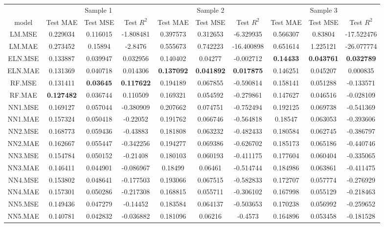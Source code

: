\begin{table}[H]
\centering\begingroup\fontsize{6}{8}\selectfont

\begin{tabular}{cccccccccc}
\toprule
\multicolumn{1}{c}{ } & \multicolumn{3}{c}{Sample 1} & \multicolumn{3}{c}{Sample 2} & \multicolumn{3}{c}{Sample 3} \\
\cmidrule(l{3pt}r{3pt}){2-4} \cmidrule(l{3pt}r{3pt}){5-7} \cmidrule(l{3pt}r{3pt}){8-10}
model & Test MAE & Test MSE & Test $R^2$ & Test MAE & Test MSE & Test $R^2$ & Test MAE & Test MSE & Test $R^2$\\
\midrule
LM.MSE & 0.229034 & 0.116015 & -1.808481 & 0.397573 & 0.312653 & -6.329935 & 0.566307 & 0.83804 & -17.522476\\
LM.MAE & 0.273452 & 0.15894 & -2.8476 & 0.555673 & 0.742223 & -16.400898 & 0.651614 & 1.225121 & -26.077774\\
ELN.MSE & 0.133887 & 0.039947 & 0.032956 & 0.140402 & 0.04277 & -0.002712 & \textbf{0.14433} & \textbf{0.043761} & \textbf{0.032789}\\
ELN.MAE & 0.131369 & 0.040718 & 0.014306 & \textbf{0.137092} & \textbf{0.041892} & \textbf{0.017875} & 0.146251 & 0.045207 & 0.000835\\
RF.MSE & 0.131411 & \textbf{0.03645} & \textbf{0.117622} & 0.194189 & 0.067855 & -0.590814 & 0.158141 & 0.051288 & -0.133571\\
\addlinespace
RF.MAE & \textbf{0.127482} & 0.036744 & 0.110509 & 0.169321 & 0.054592 & -0.279861 & 0.147627 & 0.046516 & -0.028109\\
NN1.MSE & 0.169127 & 0.057044 & -0.380909 & 0.207662 & 0.074751 & -0.752494 & 0.192125 & 0.069738 & -0.541369\\
NN1.MAE & 0.157324 & 0.050418 & -0.22052 & 0.191762 & 0.066746 & -0.564818 & 0.18547 & 0.063053 & -0.393606\\
NN2.MSE & 0.168773 & 0.059436 & -0.43883 & 0.181808 & 0.063232 & -0.482433 & 0.180584 & 0.062745 & -0.386797\\
NN2.MAE & 0.162667 & 0.055447 & -0.342256 & 0.194277 & 0.069386 & -0.626702 & 0.185173 & 0.065186 & -0.440746\\
\addlinespace
NN3.MSE & 0.154784 & 0.050152 & -0.21408 & 0.180103 & 0.060193 & -0.411175 & 0.177604 & 0.060404 & -0.335065\\
NN3.MAE & 0.146411 & 0.044901 & -0.086967 & 0.18499 & 0.06461 & -0.514744 & 0.184986 & 0.063861 & -0.411475\\
NN4.MSE & 0.153802 & 0.048641 & -0.177503 & 0.193066 & 0.067515 & -0.582833 & 0.172707 & 0.057774 & -0.276929\\
NN4.MAE & 0.157301 & 0.050286 & -0.217308 & 0.168815 & 0.055711 & -0.306102 & 0.167998 & 0.055129 & -0.218463\\
NN5.MSE & 0.149436 & 0.047279 & -0.14452 & 0.183584 & 0.064137 & -0.503653 & 0.170238 & 0.056992 & -0.259652\\
\addlinespace
NN5.MAE & 0.140781 & 0.042832 & -0.036882 & 0.181096 & 0.06216 & -0.4573 & 0.164896 & 0.053458 & -0.181528\\
\bottomrule
\end{tabular}
\endgroup{}
\end{table}